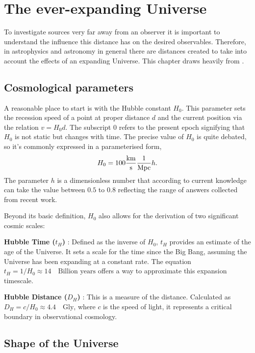 \section{The ever-expanding Universe}
To investigate sources very far away from an observer it is important to understand the influence this distance 
has on the desired observables. Therefore, in astrophysics and astronomy in general there are distances created to take into account the effects of an expanding Universe. 
This chapter draws heavily from \cite{hogg2000distance}. 


\subsection{Cosmological parameters}

A reasonable place to start is with the Hubble constant $H_0$. 
This parameter sets the recession speed of a point at proper distance $d$ and the current position via the relation $v = H_0 d$. 
The subscript $0$ refers to the present epoch signifying that $H_0$ is not static but changes with time. 
The precise value of $H_0$ is quite debated, so it's commonly expressed in a parameterised form,
$$
H_0= 100\frac{\rm km}{\rm s}\frac{1}{\rm Mpc} h.
$$
The parameter $h$ is a dimensionless number that according to current knowledge can take the value between $0.5$ to $0.8$ reflecting the range of answers collected from recent work. 

Beyond its basic definition, $H_0$ also allows for the derivation of two significant cosmic scales:

\textbf{Hubble Time ($t_H$) }: Defined as the inverse of 
$H_0$, $t_H$ provides an estimate of the age of the Universe. 
It sets a scale for the time since the Big Bang, assuming the Universe has been expanding at a constant rate. The equation 
$t_H = 1/H_0 \approx 14 \quad\text{Billion years}$ offers a way to approximate this expansion timescale.


\textbf{Hubble Distance ($D_H$) }: This is a measure of the distance. Calculated as 
$D_H = c/H_0 \approx 4.4 \quad \text{Gly}$, where $c$ is the speed of light, 
it represents a critical boundary in observational cosmology. %

\subsection{Shape of the Universe}


